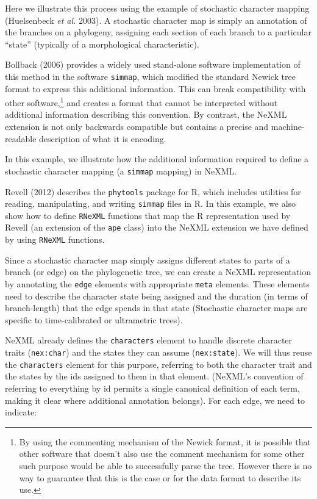 \documentclass[author-year, review, 11pt]{components/elsarticle} %
\begin{document}
Here we illustrate this process using the example of stochastic
character mapping (Huelsenbeck \emph{et al.} 2003). A stochastic
character map is simply an annotation of the branches on a phylogeny,
assigning each section of each branch to a particular ``state''
(typically of a morphological characteristic).

Bollback (2006) provides a widely used stand-alone software
implementation of this method in the software \texttt{simmap}, which
modified the standard Newick tree format to express this additional
information. This can break compatibility with other software,\footnote{By
  using the commenting mechanism of the Newick format, it is possible
  that other software that doesn't also use the comment mechanism for
  some other such purpose would be able to successfully parse the tree.
  However there is no way to guarantee that this is the case or for the
  data format to describe its use.} and creates a format that cannot be
interpreted without additional information describing this convention.
By contrast, the NeXML extension is not only backwards compatible but
contains a precise and machine-readable description of what it is
encoding.

In this example, we illustrate how the additional information required
to define a stochastic character mapping (a \texttt{simmap} mapping) in
NeXML.

Revell (2012) describes the \texttt{phytools} package for R, which
includes utilities for reading, manipulating, and writing
\texttt{simmap} files in R. In this example, we also show how to define
\texttt{RNeXML} functions that map the R representation used by Revell
(an extension of the \texttt{ape} class) into the NeXML extension we
have defined by using \texttt{RNeXML} functions.

Since a stochastic character map simply assigns different states to
parts of a branch (or edge) on the phylogenetic tree, we can create a
NeXML representation by annotating the \texttt{edge} elements with
appropriate \texttt{meta} elements. These elements need to describe the
character state being assigned and the duration (in terms of
branch-length) that the edge spends in that state (Stochastic character
maps are specific to time-calibrated or ultrametric trees).

NeXML already defines the \texttt{characters} element to handle discrete
character traits (\texttt{nex:char}) and the states they can assume
(\texttt{nex:state}). We will thus reuse the \texttt{characters} element
for this purpose, referring to both the character trait and the states
by the ids assigned to them in that element. (NeXML's convention of
referring to everything by id permits a single canonical definition of
each term, making it clear where additional annotation belongs). For
each edge, we need to indicate:
\end{document}
